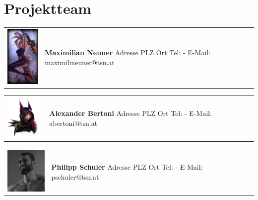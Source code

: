 \section*{Projektteam}


\begin{tabular}[t]{p{2cm} p{8cm}}
    \vspace{0pt}
    \includegraphics[width=2cm]{../images/maxi.jpg}
    &
    \vspace{0pt}
    \textbf{Maximilian Neuner}
    \newline Adresse
    \newline PLZ Ort
    \newline
    \newline Tel: -
    \newline E-Mail: maximilineuner@tsn.at
    \\
\end{tabular}

\begin{tabular}[t]{p{2cm} p{8cm}}
    \vspace{0pt}
    \includegraphics[width=2cm]{../images/alex.png}
    &
    \vspace{0pt}
    \textbf{Alexander Bertoni}
    \newline Adresse
    \newline PLZ Ort
    \newline
    \newline Tel: -
    \newline E-Mail: abertoni@tsn.at
    \\
\end{tabular}

\begin{tabular}[t]{p{2cm} p{8cm}}
    \vspace{0pt}
    \includegraphics[width=2cm]{../images/philipp.jpg}
    &
    \vspace{0pt}
    \textbf{Philipp Schuler}
    \newline Adresse
    \newline PLZ Ort
    \newline
    \newline Tel: -
    \newline E-Mail: pschuler@tsn.at
    \\
\end{tabular}

